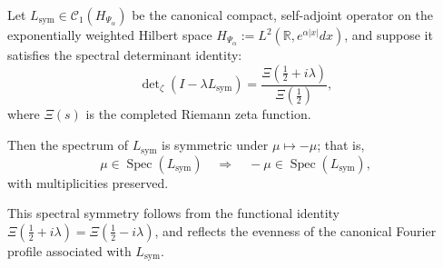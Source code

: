 \begin{lemma}
\label{lem:spectral_symmetry}
Let \( L_{\mathrm{sym}} \in \mathcal{C}_1(H_{\Psi_\alpha}) \) be the canonical compact, self-adjoint operator on the exponentially weighted Hilbert space \( H_{\Psi_\alpha} := L^2(\mathbb{R}, e^{\alpha |x|} dx) \), and suppose it satisfies the spectral determinant identity:
\[
\det\nolimits_{\zeta}(I - \lambda L_{\mathrm{sym}}) = \frac{\Xi\left( \tfrac{1}{2} + i\lambda \right)}{\Xi\left( \tfrac{1}{2} \right)},
\]
where \( \Xi(s) \) is the completed Riemann zeta function.

Then the spectrum of \( L_{\mathrm{sym}} \) is symmetric under \( \mu \mapsto -\mu \); that is,
\[
\mu \in \operatorname{Spec}(L_{\mathrm{sym}}) \quad \Longrightarrow \quad -\mu \in \operatorname{Spec}(L_{\mathrm{sym}}),
\]
with multiplicities preserved.

\medskip
\noindent
This spectral symmetry follows from the functional identity \( \Xi(\tfrac{1}{2} + i\lambda) = \Xi(\tfrac{1}{2} - i\lambda) \), and reflects the evenness of the canonical Fourier profile associated with \( L_{\mathrm{sym}} \).
\end{lemma}
